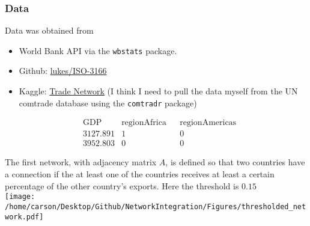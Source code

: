 \documentclass[notheorems]{beamer}
\theoremstyle{definition}
\begin{document}
\begin{frame}[fragile]
\frametitle{Data}
Data was obtained from 
\begin{itemize}
\item World Bank API via the 
\verb|wbstats| package. 
\item Github: \href{https://github.com/lukes/ISO-3166-Countries-with-Regional-Codes}{lukes/ISO-3166} 
\item Kaggle: \href{https://www.kaggle.com/datasets/yasirtariq/tradenetwork}{Trade Network} (I think I need to pull the data myself from the UN comtrade database using the \verb|comtradr| package)
\end{itemize}

\begin{align*}
&\text{GDP} & \text{regionAfrica} && \text{regionAmericas} \\
& 3127.891         &   1         &&  0  \\
& 3952.803         &   0         &&  0
\end{align*}
          
\end{frame}

















\begin{frame}
The first network, with adjacency matrix $A$, is defined so that two countries have a connection if the at least one of the countries receives at least a certain percentage of the other country's exports. Here the threshold is $0.15$\\
\texttt{[image: /home/carson/Desktop/Github/NetworkIntegration/Figures/thresholded\_network.pdf]}

\end{frame}
\end{document}
